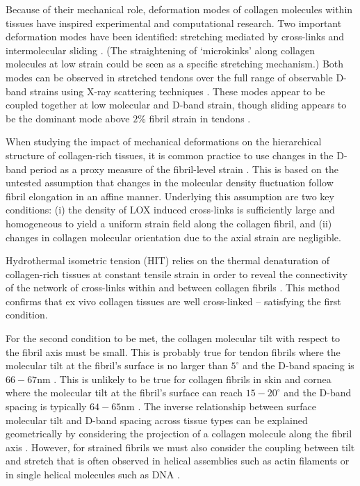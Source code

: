 \documentclass[preprint,12pt]{elsarticle}
\begin{document}
Because of their mechanical role, deformation modes of collagen molecules within tissues have inspired experimental and computational research. Two important deformation modes have been identified: stretching mediated by cross-links and intermolecular sliding \cite{Depalle:2015}. (The straightening of `microkinks' along collagen molecules at low strain \cite{Misof:1997} could be seen as a specific stretching mechanism.) Both modes can be observed in stretched tendons over the full range of observable D-band strains using X-ray scattering techniques \cite{Gautieri:2017}. These modes appear to be coupled together at low molecular and D-band strain, though sliding appears to be the dominant mode above $2\%$ fibril strain in tendons \cite{Sasaki:1996, Gautieri:2017}. 

When studying the impact of mechanical deformations on the hierarchical structure of collagen-rich tissues, it is common practice to use changes in the D-band period as a proxy measure of the fibril-level strain \cite{Sasaki:1996, Misof:1997, Aziz:2018, Gautieri:2017, Gachon:2020}. This is based on the untested assumption that changes in the molecular density fluctuation follow fibril elongation in an affine manner. Underlying this assumption are two key conditions: (i) the density of LOX induced cross-links is sufficiently large  and homogeneous to yield a uniform strain field along the collagen fibril, and (ii) changes in collagen molecular orientation due to the axial strain are negligible.

Hydrothermal isometric tension (HIT) relies on the thermal denaturation of collagen-rich tissues at constant tensile strain in order to reveal the connectivity of the network of cross-links within and between collagen fibrils \cite{Lous:1983}. This method confirms that ex vivo collagen tissues are well cross-linked \cite{Lous:1983, Allain:1980, Kampmeier:2000, Herod:2016} -- satisfying the first condition.

For the second condition to be met, the collagen molecular tilt with respect to the fibril axis must be small. This is probably true for tendon fibrils where the molecular tilt at the fibril’s surface is no larger than $5^\circ$ and the D-band spacing is $66-67\mathrm{nm}$ \cite{Hulmes:1981, Quan:2015}. This is unlikely to be true for collagen fibrils in skin and cornea where the molecular tilt at the fibril’s surface can reach $15-20^\circ$ and the D-band spacing is typically $64-65\mathrm{nm}$ \cite{Raspanti:2018, Brodsky:1980}. The inverse relationship between surface molecular tilt and D-band spacing across tissue types can be explained geometrically by considering the projection of a collagen molecule along the fibril axis \cite{Cameron:2020, Bozec:2007}. However, for strained fibrils we must also consider the coupling between tilt and stretch that is often observed in helical assemblies such as actin filaments \cite{Tsuda:1996} or in single helical molecules such as DNA \cite{Sheinin:2009}.
\end{document}
